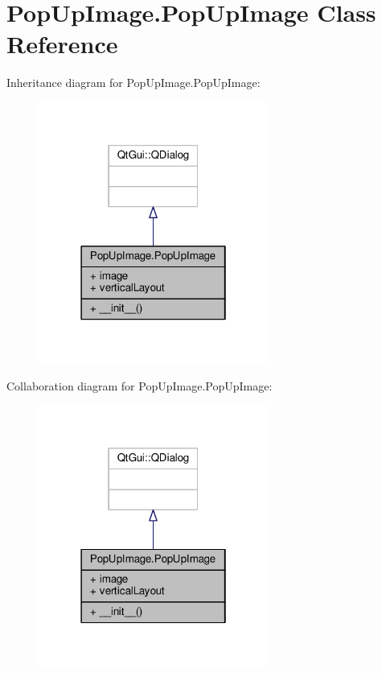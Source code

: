 \hypertarget{classPopUpImage_1_1PopUpImage}{}\section{Pop\+Up\+Image.\+Pop\+Up\+Image Class Reference}
\label{classPopUpImage_1_1PopUpImage}


Inheritance diagram for Pop\+Up\+Image.\+Pop\+Up\+Image\+:\nopagebreak
\begin{figure}[H]
\begin{center}
\leavevmode
\includegraphics[width=214pt]{classPopUpImage_1_1PopUpImage__inherit__graph}
\end{center}
\end{figure}


Collaboration diagram for Pop\+Up\+Image.\+Pop\+Up\+Image\+:\nopagebreak
\begin{figure}[H]
\begin{center}
\leavevmode
\includegraphics[width=214pt]{classPopUpImage_1_1PopUpImage__coll__graph}
\end{center}
\end{figure}
